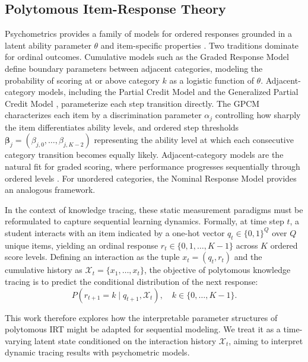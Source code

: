 \documentclass[pdflatex,sn-apa]{sn-jnl}
\begin{document}
\subsection{Polytomous Item-Response Theory}
\label{sec:polytomous_irt}
Psychometrics provides a family of models for ordered responses grounded in a latent ability parameter $\theta$ and item-specific properties \citep{hambleton_item_1985, embretson_irt_2000}. Two traditions dominate for ordinal outcomes. Cumulative models such as the Graded Response Model \citep[GRM;][]{samejima_estimation_1969} define boundary parameters between adjacent categories, modeling the probability of scoring at or above category $k$ as a logistic function of $\theta$. Adjacent-category models, including the Partial Credit Model \citep[PCM;][]{masters_partial_1997} and the Generalized Partial Credit Model \citep[GPCM;][]{van_der_linden_generalized_1997}, parameterize each step transition directly. The GPCM characterizes each item by a discrimination parameter $\alpha_j$ controlling how sharply the item differentiates ability levels, and ordered step thresholds $\boldsymbol{\beta}_j = (\beta_{j,0}, \ldots, \beta_{j,K-2})$ representing the ability level at which each consecutive category transition becomes equally likely. Adjacent-category models are the natural fit for graded scoring, where performance progresses sequentially through ordered levels \citep{embretson_irt_2000, wilson_constructing_2005}. For unordered categories, the Nominal Response Model \citep[NRM;][]{bock_estimating_1972} provides an analogous framework.

In the context of knowledge tracing, these static measurement paradigms must be reformulated to capture sequential learning dynamics. Formally, at time step $t$, a student interacts with an item indicated by a one-hot vector $q_t \in \{0,1\}^Q$ over $Q$ unique items, yielding an ordinal response $r_t \in \{0,1,\ldots,K-1\}$ across $K$ ordered score levels. Defining an interaction as the tuple $x_t=(q_t,r_t)$ and the cumulative history as $\mathcal{X}_t=\{x_1,\ldots,x_t\}$, the objective of polytomous knowledge tracing is to predict the conditional distribution of the next response:
\begin{equation}
    P(r_{t+1}=k \mid q_{t+1}, \mathcal{X}_t), \quad k \in \{0,\ldots,K-1\}.
\end{equation}


This work therefore explores how the interpretable parameter structures of polytomous IRT might be adapted for sequential modeling. We treat it as a time-varying latent state conditioned on the interaction history $\mathcal{X}_t$, aiming to interpret dynamic tracing results with psychometric models.
\end{document}
